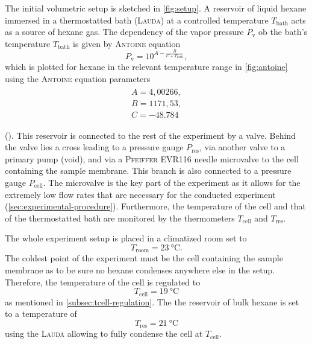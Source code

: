 \documentclass[../thesis.tex]{subfiles}
\begin{document}
        The initial volumetric setup is sketched in \cref{fig:setup}. A reservoir of liquid hexane immersed in a thermostatted bath (\textsc{Lauda}) at a controlled temperature $T_\mathrm{bath}$ acts as a source of hexane gas. The dependency of the vapor pressure $P_\mathrm{v}$ ob the bath's temperature $T_\mathrm{bath}$ is given by \textsc{Antoine} equation
        \begin{equation}
          P_\mathrm{v}=10^{A- \frac{B}{C+T_\mathrm{bath}}},
          \label{eq:antoine-equation}
        \end{equation}
        which is plotted for hexane in the relevant temperature range in \cref{fig:antoine} using the \textsc{Antoine} equation parameters
        \begin{align}
          \begin{split}
              A=4,00266,	\\
              B=1171,53,  \\
              C=-48.784
          \end{split}
          \label{eq:antoine-parameters} %
        \end{align}

        

        (\cite{antoine-pars}). This reservoir is connected to the rest of the experiment by a valve. Behind the valve lies a cross leading to a pressure gauge $P_\mathrm{res}$, via another valve to a primary pump (void), and via a \textsc{Pfeiffer} EVR116 needle microvalve to the cell containing the sample membrane. This branch is also connected to a pressure gauge $P_\mathrm{cell}$. The microvalve is the key part of the experiment as it allows for the extremely low flow rates that are necessary for the conducted experiment (\cref{sec:experimental-procedure}). Furthermore, the temperature of the cell and that of the thermostatted bath are monitored by the thermometers $T_\mathrm{cell}$ and $T_\mathrm{res}$.
        \medskip

        

        The whole experiment setup is placed in a climatized room set to \begin{equation}
            T_\mathrm{room} = \SI{23}{\celsius}.
        \end{equation}
        The coldest point of the experiment must be the cell containing the sample membrane as to be sure no hexane condenses anywhere else in the setup. Therefore, the temperature of the cell is regulated to
        \begin{equation}
            T_\mathrm{cell} = \SI{19}{\celsius}
        \end{equation}
        as mentioned in \cref{subsec:tcell-regulation}. The the reservoir of bulk hexane is set to a temperature of
        \begin{equation}
            T_\mathrm{res} = \SI{21}{\celsius}
        \end{equation}
        using the \textsc{Lauda} allowing to fully condense the cell at $T_\mathrm{cell}$.
\end{document}
